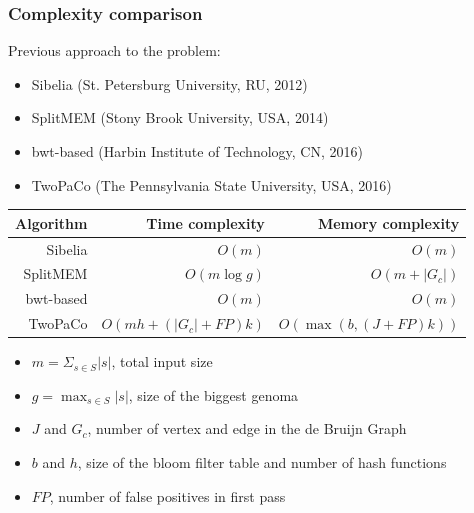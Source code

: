\begin{frame}
	\frametitle{Complexity comparison}
	
	\centering
	
	
	  Previous approach to the problem:
	
	  \begin{itemize}
	    \item Sibelia (St. Petersburg University, RU, 2012)
	    \item SplitMEM (Stony Brook University, USA, 2014)
	    \item bwt-based (Harbin Institute of Technology, CN, 2016)
	    \item TwoPaCo (The Pennsylvania State University, USA, 2016)
	  \end{itemize}

	
	  \medskip
	  
	  \begin{tabular}{ r | r | r }
    \hline
    Algorithm  &           Time complexity &        Memory complexity   \\ \hline
    Sibelia    & $O(m)$                    & $O(m)$                     \\
    SplitMEM   & $O(m \log{g})$            & $O(m + |G_{c}|)$           \\
    bwt-based  & $O(m)$                    & $O(m)$                     \\
    TwoPaCo    & $O(mh + (|G_{c}| + FP)k)$ & $O( \max(b, (J+FP)k) )$    \\    
    \hline
    \end{tabular}
    
    \medskip

	
    \begin{itemize}
      \item $m = \Sigma_{s \in S}{ |s| }$, total input size
      \item $g = \max_{s \in S}{ |s| }$, size of the biggest genoma
      \item $J$ and $G_{c}$, number of vertex and edge in the de Bruijn Graph
      \item $b$ and $h$, size of the bloom filter table and number of hash functions
      \item $FP$, number of false positives in first pass
    \end{itemize}
    

\end{frame}

